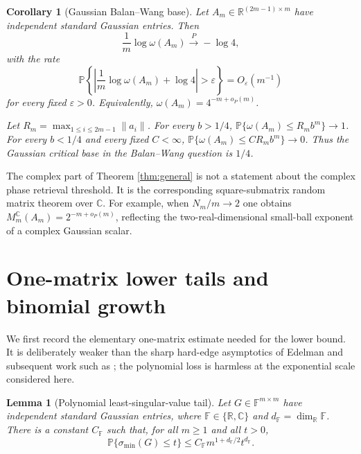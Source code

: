 \documentclass[10pt,a4paper]{amsart}
\newtheorem{corollary}[theorem]{Corollary}
\newtheorem{lemma}[theorem]{Lemma}
\newcommand{\R}{\mathbb{R}}
\newcommand{\C}{\mathbb{C}}
\newcommand{\F}{\mathbb{F}}
\newcommand{\PP}{\mathbb{P}}
\begin{document}
\begin{corollary}[Gaussian Balan--Wang base]\label{cor:bw}
Let $A_m\in\R^{(2m-1)\times m}$ have independent standard Gaussian entries. Then
\begin{equation}\label{eq:omega-limit}
  \frac{1}{m}\log\omega(A_m)\xrightarrow{P}-\log4,
\end{equation}
with the rate
\begin{equation}\label{eq:omega-rate}
  \PP\left\{\left|\frac{1}{m}\log\omega(A_m)+\log4\right|>\varepsilon\right\}=O_\varepsilon(m^{-1})
\end{equation}
for every fixed $\varepsilon>0$. Equivalently, $\omega(A_m)=4^{-m+o_P(m)}$.

Let $R_m=\max_{1\le i\le 2m-1}\|a_i\|$. For every $b>1/4$, $\PP\{\omega(A_m)\le R_m b^m\}\to1$. For
every $b<1/4$ and every fixed $C<\infty$, $\PP\{\omega(A_m)\le C R_m b^m\}\to0$. Thus the Gaussian
critical base in the Balan--Wang question is $1/4$.
\end{corollary}

The complex part of Theorem \ref{thm:general} is not a statement about the complex phase retrieval
threshold. It is the corresponding square-submatrix random matrix theorem over $\C$. For example, when
$N_m/m\to2$ one obtains $M_m^\C(A_m)=2^{-m+o_P(m)}$, reflecting the two-real-dimensional small-ball
exponent of a complex Gaussian scalar.

\section{One-matrix lower tails and binomial growth}

We first record the elementary one-matrix estimate needed for the lower bound. It is deliberately
weaker than the sharp hard-edge asymptotics of Edelman \cite{Edelman1988} and subsequent work such as
\cite{RudelsonVershynin2009,TaoVu2010}; the polynomial loss is harmless at the exponential scale
considered here.

\begin{lemma}[Polynomial least-singular-value tail]\label{lem:lsv-tail}
Let $G\in\F^{m\times m}$ have independent standard Gaussian entries, where $\F\in\{\R,\C\}$ and
$d_\F=\dim_\R\F$. There is a constant $C_\F$ such that, for all $m\ge1$ and all $t>0$,
\begin{equation}\label{eq:lsv-tail}
  \PP\{\sigma_{\min}(G)\le t\}\le C_\F m^{1+d_\F/2}t^{d_\F}.
\end{equation}
\end{lemma}
\end{document}
